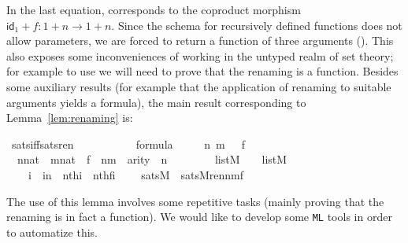 In the last equation,  corresponds to
the coproduct morphism $\mathsf{id}_{1}+f \colon 1 + n \to 1 +
n$. Since the schema for recursively defined functions does not allow
parameters, we are forced to return a function of three arguments
(). This also exposes some inconveniences of working in the
untyped realm of set theory; for example to use  we will need
to prove that the renaming is a function. Besides some auxiliary
results (for example that the application of renaming to suitable
arguments yields a formula), the main result corresponding to
Lemma~\ref{lem:renaming} is:
\begin{isabelle}
\isamarkupfalse%
\ sats{\isacharunderscore}iff{\isacharunderscore}sats{\isacharunderscore}ren\ {\isacharcolon}\ \isanewline
\ \ \ {\isasymphi}\isanewline
\ \ \ {\isachardoublequoteopen}{\isasymphi}\ {\isasymin}\ formula{\isachardoublequoteclose}\isanewline
\ \ \ \ {\isachardoublequoteopen}{\isasymAnd}\ n\ m\ {\isasymrho}\ {\isasymrho}{\isacharprime}\ f\ {\isachardot}\ \isanewline
\ \ {\isasymlbrakk}n{\isasymin}nat\ {\isacharsemicolon}\ m{\isasymin}nat\ {\isacharsemicolon}\ f\ {\isasymin}\ n{\isasymrightarrow}m\ {\isacharsemicolon}\ arity{\isacharparenleft}{\isasymphi}{\isacharparenright}\ {\isasymle}\ n\ {\isacharsemicolon}\isanewline
\ \ \ \ \ {\isasymrho}\ {\isasymin}\ list{\isacharparenleft}M{\isacharparenright}\ {\isacharsemicolon}\ {\isasymrho}{\isacharprime}\ {\isasymin}\ list{\isacharparenleft}M{\isacharparenright}\ {\isacharsemicolon}\ \isanewline
\ \ \ {\isasymAnd}\ i\ {\isachardot}\ i{\isacharless}n\ {\isasymLongrightarrow}\ nth{\isacharparenleft}i{\isacharcomma}{\isasymrho}{\isacharparenright}\ {\isacharequal}\ nth{\isacharparenleft}f{\isacharbackquote}i{\isacharcomma}{\isasymrho}{\isacharprime}{\isacharparenright}\ {\isasymrbrakk}\ {\isasymLongrightarrow}\isanewline
\ \ sats{\isacharparenleft}M{\isacharcomma}{\isasymphi}{\isacharcomma}{\isasymrho}{\isacharparenright}\ {\isasymlongleftrightarrow}\ sats{\isacharparenleft}M{\isacharcomma}ren{\isacharparenleft}{\isasymphi}{\isacharparenright}{\isacharbackquote}n{\isacharbackquote}m{\isacharbackquote}f{\isacharcomma}{\isasymrho}{\isacharprime}{\isacharparenright}{\isachardoublequoteclose}\end{isabelle}

The use of this lemma involves some repetitive tasks (mainly proving
that the renaming is in fact a function). We would like to develop
some \texttt{ML} tools in order to automatize this.


